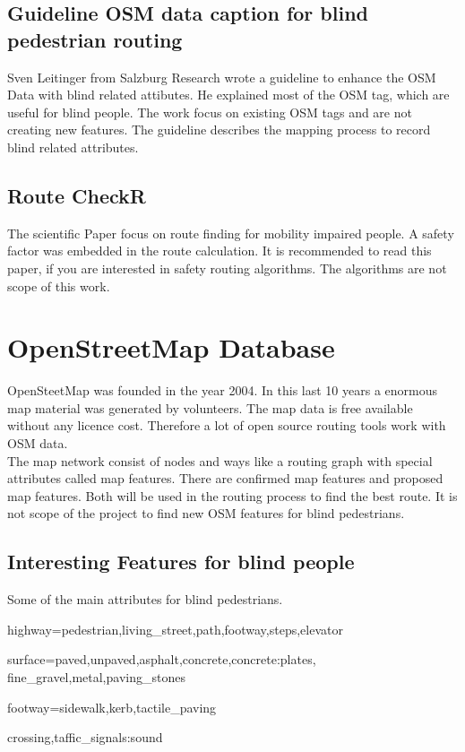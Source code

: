 \documentclass{sig-alternate}
\begin{document}
\subsection{Guideline OSM data caption for blind pedestrian routing}
Sven Leitinger\cite{sven:osm} from Salzburg Research wrote a guideline to enhance the OSM Data with blind related attibutes. He explained most of the OSM tag, which are useful for blind people. The work focus on existing OSM tags and are not creating new features. The guideline describes the mapping process to record blind related attributes.
\subsection{Route CheckR}
The scientific Paper\cite{Volkel:2008} focus on route finding for mobility impaired people. A safety factor was embedded in the route calculation. It is recommended to read this paper, if you are interested in safety routing algorithms. The algorithms are not scope of this work.  

\section{OpenStreetMap Database}
OpenSteetMap was founded in the year 2004. In this last 10 years a enormous map material was generated by volunteers. The map data is free available without any licence cost. Therefore a lot of open source routing tools work with OSM data. \\
The map network consist of nodes and ways like a routing graph with special attributes called map features. There are confirmed map features and proposed map features.  Both will be used in the routing process to find the best route. It is not scope of the project to find new OSM features for blind pedestrians.   

\subsection{Interesting Features for blind people}
Some of the main attributes for blind pedestrians.
\begin{description}
  \item highway=pedestrian,living\_street,path,footway,steps,elevator
  \item surface=paved,unpaved,asphalt,concrete,concrete:plates, fine\_gravel,metal,paving\_stones
  \item footway=sidewalk,kerb,tactile\_paving
  \item crossing,taffic\_signals:sound  
\end{description}
\end{document}
